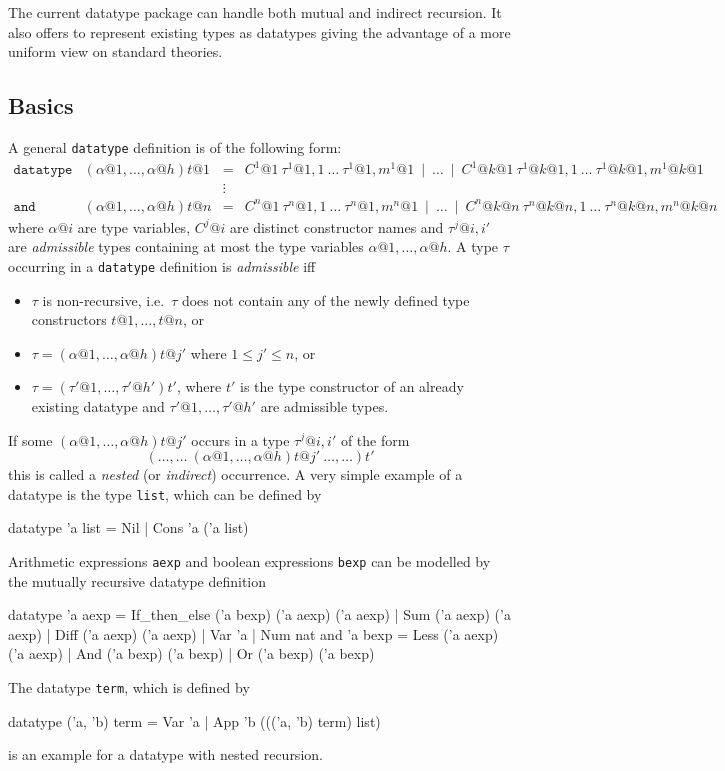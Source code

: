 The current datatype package can handle both mutual and indirect recursion.
It also offers to represent existing types as datatypes giving the advantage
of a more uniform view on standard theories.


\subsection{Basics}
\label{subsec:datatype:basics}

A general \texttt{datatype} definition is of the following form:
\[
\begin{array}{llcl}
\mathtt{datatype} & (\alpha@1,\ldots,\alpha@h)t@1 & = &
  C^1@1~\tau^1@{1,1}~\ldots~\tau^1@{1,m^1@1} ~\mid~ \ldots ~\mid~
    C^1@{k@1}~\tau^1@{k@1,1}~\ldots~\tau^1@{k@1,m^1@{k@1}} \\
 & & \vdots \\
\mathtt{and} & (\alpha@1,\ldots,\alpha@h)t@n & = &
  C^n@1~\tau^n@{1,1}~\ldots~\tau^n@{1,m^n@1} ~\mid~ \ldots ~\mid~
    C^n@{k@n}~\tau^n@{k@n,1}~\ldots~\tau^n@{k@n,m^n@{k@n}}
\end{array}
\]
where $\alpha@i$ are type variables, $C^j@i$ are distinct constructor
names and $\tau^j@{i,i'}$ are {\em admissible} types containing at
most the type variables $\alpha@1, \ldots, \alpha@h$. A type $\tau$
occurring in a \texttt{datatype} definition is {\em admissible} iff
\begin{itemize}
\item $\tau$ is non-recursive, i.e.\ $\tau$ does not contain any of the
newly defined type constructors $t@1,\ldots,t@n$, or
\item $\tau = (\alpha@1,\ldots,\alpha@h)t@{j'}$ where $1 \leq j' \leq n$, or
\item $\tau = (\tau'@1,\ldots,\tau'@{h'})t'$, where $t'$ is
the type constructor of an already existing datatype and $\tau'@1,\ldots,\tau'@{h'}$
are admissible types.
\end{itemize}
If some $(\alpha@1,\ldots,\alpha@h)t@{j'}$ occurs in a type $\tau^j@{i,i'}$
of the form
\[
(\ldots,\ldots ~ (\alpha@1,\ldots,\alpha@h)t@{j'} ~ \ldots,\ldots)t'
\]
this is called a {\em nested} (or \emph{indirect}) occurrence. A very simple
example of a datatype is the type {\tt list}, which can be defined by
\begin{ttbox}
datatype 'a list = Nil
                 | Cons 'a ('a list)
\end{ttbox}
Arithmetic expressions {\tt aexp} and boolean expressions {\tt bexp} can be modelled
by the mutually recursive datatype definition
\begin{ttbox}
datatype 'a aexp = If_then_else ('a bexp) ('a aexp) ('a aexp)
                 | Sum ('a aexp) ('a aexp)
                 | Diff ('a aexp) ('a aexp)
                 | Var 'a
                 | Num nat
and      'a bexp = Less ('a aexp) ('a aexp)
                 | And ('a bexp) ('a bexp)
                 | Or ('a bexp) ('a bexp)
\end{ttbox}
The datatype {\tt term}, which is defined by
\begin{ttbox}
datatype ('a, 'b) term = Var 'a
                       | App 'b ((('a, 'b) term) list)
\end{ttbox}
is an example for a datatype with nested recursion.

